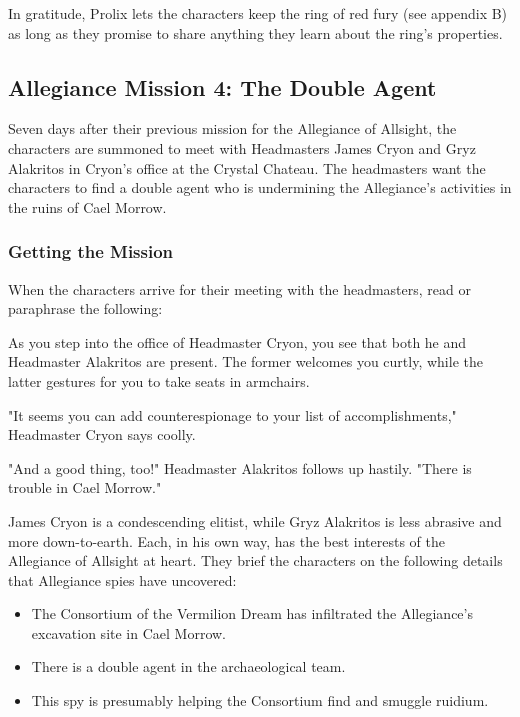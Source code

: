 \documentclass[10pt,a4paper,twoside,bg=print,twocolumn,openany,nodeprecatedcode]{dndbook}
\begin{document}
In gratitude, Prolix lets the characters keep the ring of red fury (see appendix B) as long as they promise to share anything they learn about the ring's properties.

\subsection{Allegiance Mission 4: The Double Agent}
Seven days after their previous mission for the Allegiance of Allsight, the characters are summoned to meet with Headmasters James Cryon and Gryz Alakritos in Cryon's office at the Crystal Chateau. The headmasters want the characters to find a double agent who is undermining the Allegiance's activities in the ruins of Cael Morrow.

\subsubsection{Getting the Mission}
When the characters arrive for their meeting with the headmasters, read or paraphrase the following:

\begin{DndReadAloud}{}
As you step into the office of Headmaster Cryon, you see that both he and Headmaster Alakritos are present. The former welcomes you curtly, while the latter gestures for you to take seats in armchairs.

"It seems you can add counterespionage to your list of accomplishments," Headmaster Cryon says coolly.

"And a good thing, too!" Headmaster Alakritos follows up hastily. "There is trouble in Cael Morrow."

\end{DndReadAloud}

James Cryon is a condescending elitist, while Gryz Alakritos is less abrasive and more down-to-earth. Each, in his own way, has the best interests of the Allegiance of Allsight at heart. They brief the characters on the following details that Allegiance spies have uncovered:


\begin{itemize}
\item The Consortium of the Vermilion Dream has infiltrated the Allegiance's excavation site in Cael Morrow.
\item There is a double agent in the archaeological team.
\item This spy is presumably helping the Consortium find and smuggle ruidium.
\end{itemize}
\end{document}
